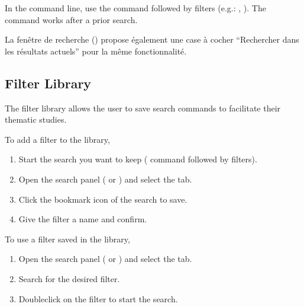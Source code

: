 \documentclass[letterpaper,10pt,english]{sphinxmanual}
\begin{document}
\sphinxAtStartPar
In the command line, use the  command followed by filters (e.g.: , ). The  command works after a prior search.

\sphinxAtStartPar
La fenêtre de recherche () propose également une case à cocher
“Rechercher dans les résultats actuels” pour la même fonctionnalité.


\subsection{Filter Library}
\label{\detokenize{annexe_filtres:bibliotheque-de-filtres}}
\sphinxAtStartPar
The filter library allows the user to save search commands to facilitate their thematic studies.

\sphinxAtStartPar
To add a filter to the library,
\begin{enumerate}
%
\item {} 
\sphinxAtStartPar
Start the search you want to keep ( command followed by filters).

\item {} 
\sphinxAtStartPar
Open the search panel ( or ) and select the  tab.

\item {} 
\sphinxAtStartPar
Click the bookmark icon of the search to save.

\item {} 
\sphinxAtStartPar
Give the filter a name and confirm.

\end{enumerate}

\sphinxAtStartPar
To use a filter saved in the library,
\begin{enumerate}
%
\item {} 
\sphinxAtStartPar
Open the search panel ( or ) and select the  tab.

\item {} 
\sphinxAtStartPar
Search for the desired filter.

\item {} 
\sphinxAtStartPar
Double\sphinxhyphen{}click on the filter to start the search.

\end{enumerate}
\end{document}

